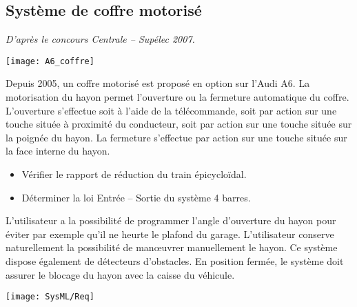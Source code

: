 \begin{multicols}{2}
\section*{Système de coffre motorisé}
\setcounter{subparagraph}{0}
\begin{flushleft}
\textit{D'après le concours Centrale -- Supélec 2007.}
\end{flushleft}
\ifprof
\else

\begin{center}
\texttt{[image: A6\_coffre]}
\end{center}

Depuis 2005, un coffre motorisé est proposé en option sur l’Audi A6. La motorisation du hayon permet l’ouverture ou la fermeture automatique du coffre. L’ouverture s’effectue soit à l’aide de la télécommande, soit par action sur une touche située à proximité du conducteur, soit par action sur une touche située sur la poignée du hayon. La fermeture s’effectue par action sur une touche située sur la face interne du hayon.



\begin{obj}
\begin{itemize}
\item Vérifier le rapport de réduction du train épicycloïdal.
\item Déterminer la loi Entrée -- Sortie du système 4 barres.
\end{itemize}
\end{obj}

L’utilisateur a la possibilité de programmer l’angle d’ouverture du hayon pour
éviter par exemple qu’il ne heurte le plafond du garage. L’utilisateur conserve
naturellement la possibilité de man\oe{}uvrer manuellement le hayon. Ce système
dispose également de détecteurs d’obstacles.
En position fermée, le système doit assurer le blocage du hayon avec la caisse
du véhicule.
\begin{center}
\texttt{[image: SysML/Req]}
\end{center}


\end{multicols}
